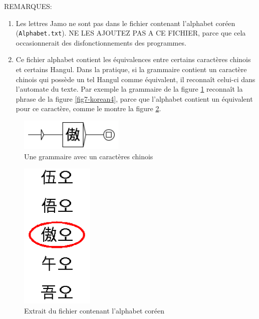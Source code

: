 \bigskip
\noindent REMARQUES: 
\begin{enumerate}
\item Les lettres Jamo ne sont pas dans le fichier contenant l'alphabet coréen
	(\verb+Alphabet.txt+). NE LES AJOUTEZ PAS A CE FICHIER, parce que cela occasionnerait
    	    des disfonctionnements des programmes.
    
\item Ce fichier alphabet contient les équivalences entre certains caractères chinois
	et certains Hangul. Dans la pratique, si la grammaire contient un caractère chinois
	qui possède un tel Hangul comme équivalent, il reconnaît celui-ci dans l'automate du texte.
	Par exemple la grammaire de la figure \ref{fig7-korean5} reconnaît la phrase de la figure
	\ref{fig7-korean4}, parce que l'alphabet contient un équivalent pour ce 
	caractère, comme le montre la figure \ref{fig7-korean6}.
\end{enumerate}

\begin{figure}[!ht]
\begin{center}
\includegraphics[width=5cm]{resources/img/fig7-korean5.png}
\caption{Une grammaire avec un caractères chinois\label{fig7-korean5}}
\end{center}
\end{figure}

\begin{figure}[!ht]
\begin{center}
\includegraphics[width=3.5cm]{resources/img/fig7-korean6.png}
\caption{Extrait du fichier contenant l'alphabet coréen\label{fig7-korean6}}
\end{center}
\end{figure}
